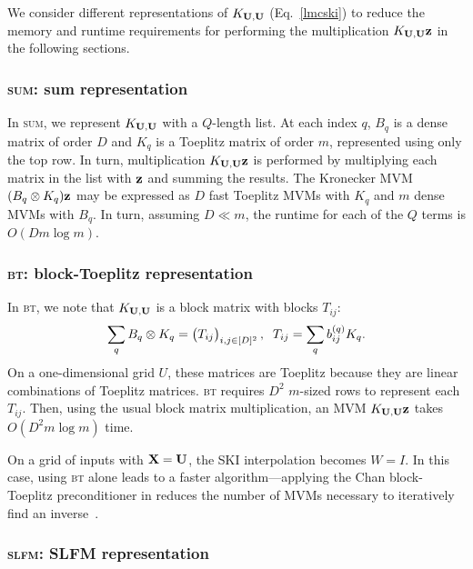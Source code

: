 \documentclass{article}
\begin{document}
We consider different representations of $K_{\textbf{U},\textbf{U}}$ (Eq.~\ref{lmcski}) to reduce the memory and runtime requirements for performing the multiplication $K_{\textbf{U},\textbf{U}}\textbf{z}$ in the following sections.

\subsubsection{\textsc{sum}: sum representation}

In \textsc{sum}, we represent $K_{\textbf{U},\textbf{U}}$ with a $Q$-length list. At each index $q$, $B_q$ is a dense matrix of order $D$ and $K_q$ is a Toeplitz matrix of order $m$, represented using only the top row. In turn, multiplication $K_{\textbf{U},\textbf{U}}\textbf{z}$ is performed by multiplying each matrix in the list with $\textbf{z}$ and summing the results. The Kronecker MVM $(B_q\otimes K_q)\textbf{z}$ may be expressed as $D$ fast Toeplitz MVMs with $K_q$ and $m$ dense MVMs with $B_q$. In turn, assuming $D\ll m$, the runtime for each of the $Q$ terms is $O(Dm\log m)$.

\subsubsection{\textsc{bt}: block-Toeplitz representation}

In \textsc{bt}, we note that $K_{\textbf{U},\textbf{U}}$ is a block matrix with blocks $T_{ij}$:
\begin{align*}
\sum_qB_q\otimes K_q =\begin{pmatrix} T_{ij} \end{pmatrix}_{i,j\in[D]^2},\;\; T_{ij}=\sum_qb_{ij}^{(q)}K_q.
\end{align*}
On a one-dimensional grid $U$, these matrices are Toeplitz because they are linear combinations of Toeplitz matrices. \textsc{bt} requires $D^2$ $m$-sized rows to represent each $T_{ij}$. Then, using the usual block matrix multiplication, an MVM $K_{\textbf{U},\textbf{U}}\textbf{z}$ takes $O(D^2m\log m)$ time.

On a grid of inputs with $\textbf{X}=\textbf{U}$, the SKI interpolation becomes $W=I$. In this case, using \textsc{bt} alone leads to a faster algorithm---applying the Chan block-Toeplitz preconditioner in reduces the number of MVMs necessary to iteratively find an inverse~\cite{chan1994circulant}.

\subsubsection{\textsc{slfm}: SLFM representation}
\end{document}
